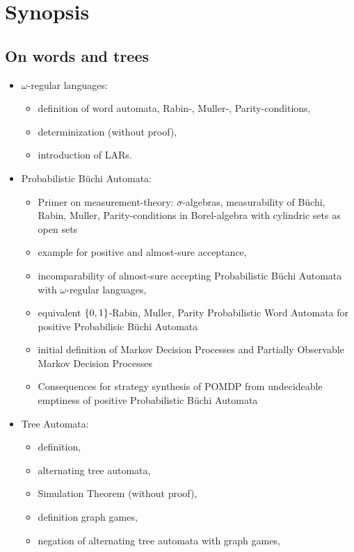 \documentclass{scrartcl}
\begin{document}
\section*{Synopsis}
\subsection*{On words and trees}
\begin{itemize}
  \item $\omega$-regular languages: 
    \begin{itemize}
      \item definition of word automata, Rabin-, Muller-, Parity-conditions,
      \item determinization (without proof), 
      \item introduction of LARs.
    \end{itemize}
  \item Probabilistic Büchi Automata:
    \begin{itemize} 
      \item Primer on measurement-theory: $\sigma$-algebras, 
        measurability of Büchi, Rabin, Muller, Parity-conditions in 
        Borel-algebra with cylindric sets as open sets
      \item example for positive and almost-sure acceptance,
      \item incomparability of almost-sure accepting Probabilistic Büchi 
        Automata with $\omega$-regular languages,
      \item equivalent $\left\{0,1\right\}$-Rabin, Muller, Parity Probabilistic Word 
        Automata for positive Probabilisic Büchi Automata
      \item initial definition of Markov Decision Processes 
        and Partially Observable Markov Decision Processes
      \item Consequences for strategy synthesis of POMDP from undecideable
        emptiness of positive Probabilistic Büchi Automata
    \end{itemize}
  \item Tree Automata:
    \begin{itemize}
      \item definition,
      \item alternating tree automata,
      \item Simulation Theorem (without proof), 
      \item definition graph games, 
      \item negation of alternating tree automata with graph games, 

\end{itemize}
\end{itemize}
\end{document}
